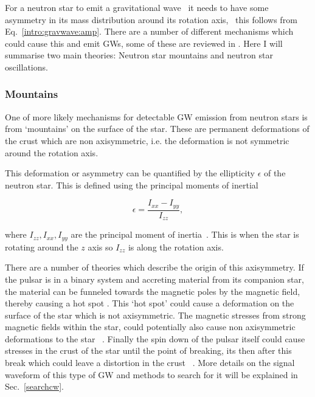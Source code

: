 For a neutron star to emit a gravitational wave~ it needs to have some asymmetry in its mass distribution around its
rotation axis,~ this follows from
Eq.~\ref{intro:gravwave:amp}.  There are a number of different mechanisms which
could cause this and emit \glspl{GW}, some of these are reviewed in
\citep{glampedakis2017GravitationalWaves,riles2017RecentSearches,haskell2015DetectingGravitational,lasky2015GravitationalWaves}.
Here I will summarise two main theories: Neutron star mountains and neutron
star oscillations.

\subsubsection{\label{intro:source:cw:mountain}Mountains}

One of more likely mechanisms for detectable \gls{GW} emission from neutron
stars is from `mountains' on the surface of the star.  These are permanent
deformations of the crust which are non axisymmetric, i.e. the deformation is
not symmetric around the rotation axis.

This deformation or asymmetry can be quantified by the ellipticity $\epsilon$ of the neutron star.
This is defined using the principal moments of inertial

\begin{equation}
\label{ellipticity}
\epsilon = \frac{I_{xx}-I_{yy}}{I_{zz}},
\end{equation}

where $I_{zz},I_{xx},I_{yy}$ are the principal moment of inertia~.
This is when the star is rotating around the $z$ axis so $I_{zz}$ is along the
rotation axis.~ 

There are a number of theories which describe the origin of this axisymmetry.
If the pulsar is in a binary system and accreting material from its companion
star, the material can be funneled towards the magnetic poles by the magnetic
field, thereby causing a hot spot \citep{haskell2015DetectingGravitational}.
This `hot spot' could cause a deformation on the surface of the star which is
not axisymmetric.  The magnetic stresses from strong magnetic fields within the
star, could potentially also cause non axisymmetric deformations to the star
\citep{}~. Finally
the spin down of the pulsar itself could cause stresses in the crust of the
star until the point of breaking, its then after this break which could leave a
distortion in the crust \citep{becker2009NeutronStars}~.  More details on the signal waveform of this type of \gls{GW} and
methods to search for it will be explained in Sec.~\ref{searchcw}.
 
